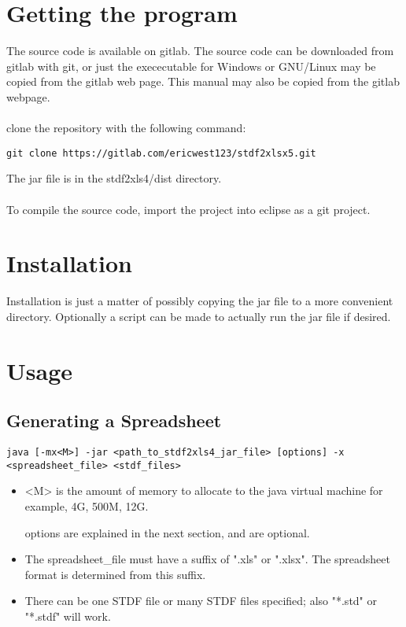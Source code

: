 \documentclass[letterpaper]{article}
\begin{document}
\section{Getting the program}

The source code is available on gitlab. The source code can be downloaded
from gitlab with git, or just the exececutable for Windows or GNU/Linux
may be copied from the gitlab web page.  This manual may also be copied
from the gitlab webpage.\\
\\
clone the repository with the following command:
\begin{verbatim}
git clone https://gitlab.com/ericwest123/stdf2xlsx5.git
\end{verbatim}

The jar file is in the stdf2xls4/dist directory.\\
\\
To compile the source code, import the project into eclipse as a git project.

\section{Installation}

Installation is just a matter of possibly copying the jar file to a more convenient
directory.  Optionally a script can be made to actually run the jar file if desired.

\section{Usage}

\subsection{Generating a Spreadsheet}
\begin{verbatim}
java [-mx<M>] -jar <path_to_stdf2xls4_jar_file> [options] -x <spreadsheet_file> <stdf_files>
\end{verbatim}
\begin{itemize}
\item <M> is the amount of memory to allocate to the java virtual machine for example, 4G, 500M, 12G.
\item [options] are explained in the next section, and are optional.
\item The spreadsheet\_file must have a suffix of ".xls" or ".xlsx".  The spreadsheet format is
determined from this suffix.
\item There can be one STDF file or many STDF files specified; also "*.std" or "*.stdf" will work.
\end{itemize}
\end{document}
